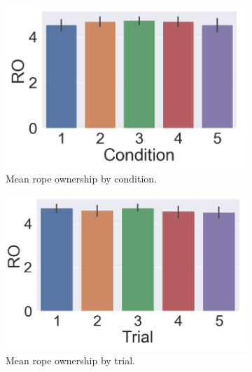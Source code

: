 \begin{figure}[H]
 \begin{subfigure}[b]{0.3\textwidth}
     \centering
     \includegraphics[scale=0.3]{Files/Plots/rocond.png}
     \caption{Mean rope ownership by condition.}
     \label{fig:ropeOwnCond}
 \end{subfigure}
  \begin{subfigure}[b]{0.3\textwidth}
     \centering
     \includegraphics[scale=0.3]{Files/Plots/rotrial.png}
     \caption{Mean rope ownership by trial.}
     \label{fig:ropeOwnTrial}
 \end{subfigure}
 \begin{subfigure}[b]{0.3\textwidth}
     \centering

\end{subfigure}
\end{figure}
